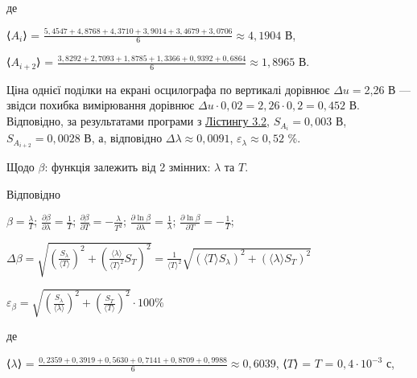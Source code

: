 \documentclass[12pt,a4paper]{article}
\begin{document}
    де

    \begin{center}
        ⟨$\displaystyle A_i$⟩ = $\displaystyle \frac{5,4547 + 4,8768 + 4,3710 + 3,9014 + 3,4679 + 3,0706}{6} \approx 4,1904$ В,
    \end{center}

    \begin{center}
        ⟨$\displaystyle A_{i+2}$⟩ = $\displaystyle \frac{3,8292 + 2,7093 + 1,8785 + 1,3366 + 0,9392 + 0,6864}{6} \approx 1,8965$ В.
    \end{center}

    Ціна однієї поділки на екрані осцилографа по вертикалі дорівнює $\Delta u = $2,26 В --- звідси похибка вимірювання дорівнює $\Delta u \cdot 0,02 = 2,26 \cdot 0,2 = 0,452$ В.
    Відповідно, за результатами програми з \hyperlink{listing2}{Лістингу 3.2}, $S_{A_i} = 0,003$ В, $S_{A_{i+2}} = 0,0028$ В, а, відповідно $\Delta \lambda \approx 0,0091$, $\varepsilon_{\lambda} \approx 0,52$ \%.

    Щодо $\beta$: функція залежить від 2 змінних: $\lambda$ та $T$.

    Відповідно

    \begin{center}
        $\displaystyle \beta = \frac{\lambda}{T}$; $\displaystyle \frac{\partial \beta}{\partial \lambda} = \frac{1}{T}$; $\displaystyle \frac{\partial \beta}{\partial T} = -\frac{\lambda}{T^2}$;
        $\displaystyle \frac{\partial \ln \beta}{\partial \lambda} = \frac{1}{\lambda}$; $\displaystyle \frac{\partial \ln \beta}{\partial T} = -\frac{1}{T}$;
    \end{center}

    \begin{center}
        $\displaystyle \Delta \beta = \sqrt{\left( \frac{S_{\lambda}}{\text{⟨}T\text{⟩}} \right)^2 + \left( \frac{\text{⟨}\lambda\text{⟩}}{\text{⟨}T\text{⟩}^2} S_T \right)^2} =
        \frac{1}{\text{⟨}T\text{⟩}^2} \sqrt{\left(\text{⟨}T\text{⟩} S_{\lambda}\right)^2 + \left(\text{⟨}\lambda\text{⟩} S_T\right)^2}$
    \end{center}

    \begin{center}
        $\displaystyle \varepsilon_{\beta} = \sqrt{\left( \frac{S_{\lambda}}{\text{⟨}\lambda\text{⟩} }\right)^2 +
        \left(\frac{S_T}{\text{⟨}T\text{⟩}} \right)^2} \cdot 100 \%$
    \end{center}

    де

    \begin{center}
        ⟨$\lambda$⟩ = $\displaystyle \frac{0,2359 + 0,3919 + 0,5630 + 0,7141 + 0,8709 + 0,9988}{6} \approx 0,6039$, ⟨$T$⟩ = $T$ = $0,4 \cdot 10^{-3}$ с,
    \end{center}
\end{document}
